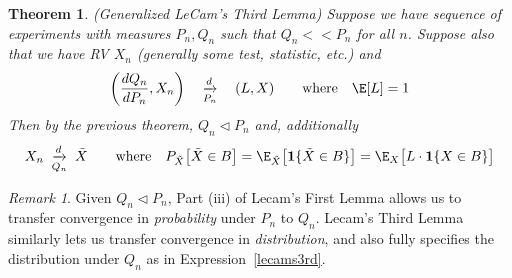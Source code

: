 \documentclass[12pt]{article}
\theoremstyle{plain}
\newtheorem{thm}{Theorem}[section]
\newtheorem{cor}[thm]{Corollary}
\theoremstyle{definition}
\theoremstyle{remark}
\newtheorem*{rmk}{Remark}
\newcommand{\dto}{\xrightarrow{d}}
\begin{document}
\begin{thm}
\label{thm:lecams3rd}
\emph{(Generalized LeCam's Third Lemma)}
Suppose we have sequence of experiments with measures $P_n,Q_n$ such
that $Q_n<<P_n$ for all $n$. Suppose also that we have RV $X_n$
(generally some test, statistic, etc.) and
\begin{align*}
  \left(\frac{dQ_n}{dP_n},X_n\right)
  \quad\underset{P_n}{\dto}\quad
  (L,X)
  \qquad \text{where}\quad
  \E[L]=1
\end{align*}
Then by the previous theorem, $Q_n\vartriangleleft P_n$ and,
additionally
\begin{align}
  X_n\;\underset{Q_n}{\dto}\;\tilde{X}
  \qquad \text{where}\quad
  P_{\tilde{X}}\big[\tilde{X}\in B\big]
  = \E_{\tilde{X}}\big[\mathbf{1}\{\tilde{X}\in B\}\big]
  =\E_X\big[L\cdot \mathbf{1}\{X\in B\}\big]
  \label{lecams3rd}
\end{align}
\end{thm}
\begin{rmk}
Given $Q_n\vartriangleleft P_n$, Part (iii) of Lecam's First Lemma
allows us to transfer convergence in \emph{probability} under $P_n$ to
$Q_n$.
Lecam's Third Lemma similarly lets us transfer convergence in
\emph{distribution}, and also fully specifies the distribution under
$Q_n$ as in Expression~\ref{lecams3rd}.
\end{rmk}

\end{document}
